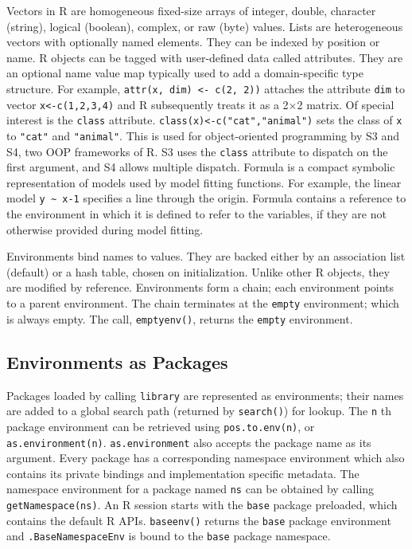 \documentclass[10pt,review,sigplan,anonymous=true,authorversion=true,nonacm=true]{acmart}
\newcommand{\code}[1]{\lstinline |#1|\xspace}
\newcommand{\asEnvironment}{\code{as.environment}}
\begin{document}
Vectors in R are homogeneous fixed-size arrays of integer, double, character
(string), logical (boolean), complex, or raw (byte) values. Lists are
heterogeneous vectors with optionally named elements. They can be indexed by
position or name. R objects can be tagged with user-defined data called
attributes. They are an optional name value map typically used to add a
domain-specific type structure. For example, \code{attr(x, dim) <- c(2, 2))}
attaches the attribute \code{dim} to vector \code{x<-c(1,2,3,4)} and R
subsequently treats it as a 2$\times$2 matrix. Of special interest is the
\code{class} attribute. \code{class(x)<-c("cat","animal")} sets the class of
\code{x} to \code{"cat"} and \code{"animal"}. This is used for object-oriented
programming by S3 and S4, two OOP frameworks of R. S3 uses the \code{class}
attribute to dispatch on the first argument, and S4 allows multiple dispatch.
Formula is a compact symbolic representation of models used by model fitting
functions. For example, the linear model \code{y ~ x-1} specifies a line through
the origin. Formula contains a reference to the environment in which it is
defined to refer to the variables, if they are not otherwise provided during
model fitting.

Environments bind names to values. They are backed either by an association list
(default) or a hash table, chosen on initialization. Unlike other R objects,
they are modified by reference. Environments form a chain; each environment
points to a parent environment. The chain terminates at the \code{empty}
environment; which is always empty. The call, \code{emptyenv()}, returns the
\code{empty} environment.

\subsection{Environments as Packages}

Packages loaded by calling \code{library} are represented as environments; their
names are added to a global search path (returned by \code{search()}) for
lookup. The \code{n}th package environment can be retrieved using
\code{pos.to.env(n)}, or \code{as.environment(n)}. \asEnvironment also accepts
the package name as its argument. Every package has a corresponding namespace
environment which also contains its private bindings and implementation specific
metadata. The namespace environment for a package named \code{ns} can be
obtained by calling \code{getNamespace(ns)}. An R session starts with the
\code{base} package preloaded, which contains the default R APIs.
\code{baseenv()} returns the \code{base} package environment and
\code{.BaseNamespaceEnv} is bound to the \code{base} package namespace.
\end{document}
